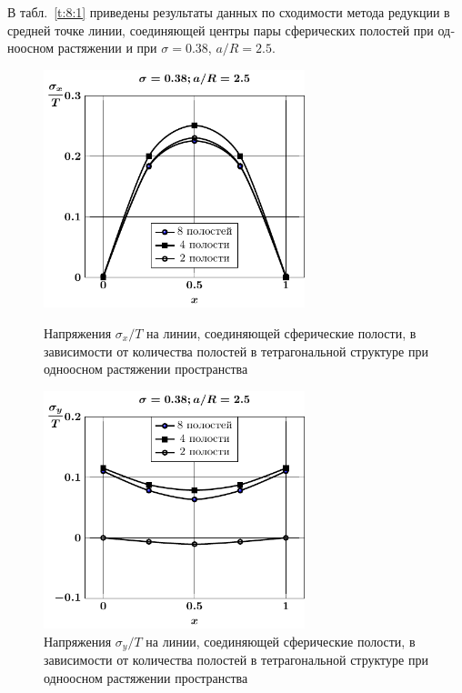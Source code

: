 \begin{russian}
В табл.~\ref{t:8:1} приведены результаты данных по сходимости метода редукции в средней точке линии, соединяющей центры пары сферических полостей при одноосном растяжении и при $\sigma=0.38$, $a/R=2.5$.

\begin{figure}[h!]
\centering\footnotesize
\parbox[b]{7.5cm}{\centering\includegraphics[width=7.6cm]{cav8-4-2-sig_x-spheres.pdf}
\caption{Напряжения $\sigma_x/T$ на линии, соединяющей сферические полости, в зависимости от количества полостей в тетрагональной структуре при одноосном растяжении пространства
\label{f:8:6}}}\hfil\hfil
\parbox[b]{7.5cm}{\centering\includegraphics[width=7.6cm]{cav8-4-2-sig_y-spheres.pdf}
\caption{Напряжения $\sigma_y/T$ на линии, соединяющей сферические полости, в зависимости от количества полостей в тетрагональной структуре при одноосном растяжении пространства
\label{f:8:7}}}
\end{figure}

%


\end{russian}
